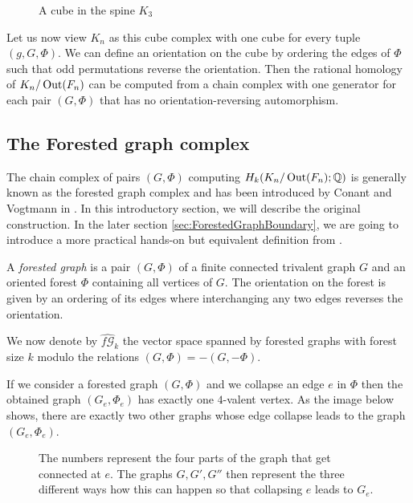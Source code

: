\begin{figure}[htbp]
	\centering
	\caption{A cube in the spine $K_{3}$}
	\label{fig:spineCube}
\end{figure}
Let us now view $K_{n}$ as this cube complex with one cube for every tuple $(g,G,\Phi)$. 
We can define an orientation on the cube by ordering the edges of $\Phi$ such that odd permutations reverse the orientation. 
Then the rational homology of $K_{n} / \operatorname{Out}(F_{n})$ can be computed from a chain complex with one generator for each pair $(G,\Phi)$ that has no 
orientation-reversing automorphism.

\subsection{The Forested graph complex}
The chain complex of pairs $(G,\Phi)$ computing $H_{k}(K_{n} / \operatorname{Out}(F_{n});\mathbb{Q})$ is generally known as the forested graph complex and has been
introduced by Conant and Vogtmann in \cite{conant03}. In this introductory section,
we will describe the original construction. In the later section \ref{sec:ForestedGraphBoundary}, we are going to
introduce a more practical hands-on but equivalent definition from \cite{conant08}.

\begin{definition}
	A \emph{forested graph} is a pair $(G,\Phi)$ of a finite connected trivalent graph $G$ and an oriented forest $\Phi$ containing all vertices of $G$.
	The orientation on the forest is given by an ordering of its edges where interchanging any two edges reverses the orientation.
\end{definition}

We now denote by $\widehat{f\mathcal{G}}_{k}$ the vector space spanned by forested graphs with forest size $k$ modulo the relations
$(G,\Phi) = -(G,-\Phi)$.

If we consider a forested graph $(G,\Phi)$ and we collapse an edge $e$ in $\Phi$ then the obtained graph $(G_{e},\Phi_{e})$ 
has exactly one $4$-valent vertex. As the image below shows, there are exactly two other graphs
whose edge collapse leads to the graph $(G_{e},\Phi_{e})$.

\begin{figure}[bhtp]
	\centering
	\captionsetup{width=0.8\textwidth}
	\caption{The numbers represent the four parts of the graph that get connected at $e$.
		The graphs $G,G',G''$ then represent the three different ways how this can happen so that
	collapsing $e$ leads to $G_{e}$.}
\end{figure}

